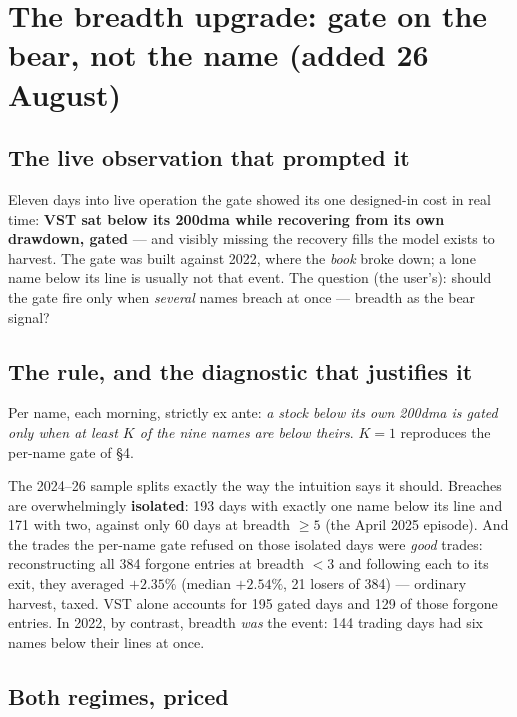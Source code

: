 \documentclass[11pt,a4paper]{article}
\newcommand{\good}[1]{{\color{bcteal}\textbf{#1}}}
\begin{document}
\section{The breadth upgrade: gate on the bear, not the name (added 26 August)}

\subsection{The live observation that prompted it}

Eleven days into live operation the gate showed its one designed-in cost in
real time: \textbf{VST sat below its 200dma while recovering from its own
drawdown, gated} --- and visibly missing the recovery fills the model exists to
harvest. The gate was built against 2022, where the \emph{book} broke down; a
lone name below its line is usually not that event. The question (the user's):
should the gate fire only when \emph{several} names breach at once --- breadth
as the bear signal?

\subsection{The rule, and the diagnostic that justifies it}

Per name, each morning, strictly ex ante: \emph{a stock below its own 200dma is
gated only when at least $K$ of the nine names are below theirs}. $K{=}1$
reproduces the per-name gate of \S4.

The 2024--26 sample splits exactly the way the intuition says it should.
Breaches are overwhelmingly \textbf{isolated}: 193 days with exactly one name
below its line and 171 with two, against only 60 days at breadth ${\ge}5$ (the
April 2025 episode). And the trades the per-name gate refused on those isolated
days were \emph{good} trades: reconstructing all 384 forgone entries at breadth
$<3$ and following each to its exit, they averaged \good{$+2.35\%$} (median
$+2.54\%$, 21 losers of 384) --- ordinary harvest, taxed. VST alone accounts for
195 gated days and 129 of those forgone entries. In 2022, by contrast, breadth
\emph{was} the event: 144 trading days had six names below their lines at once.

\subsection{Both regimes, priced}
\end{document}
